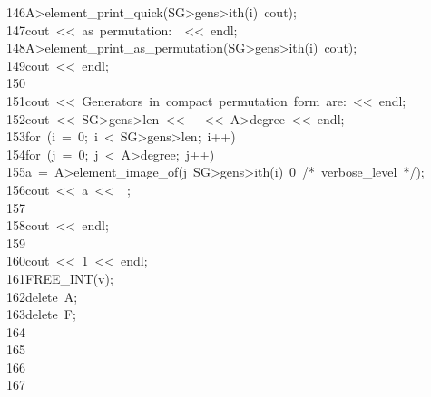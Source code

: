 \begin{tabbing}
146\>\>\>A>element\_print\_quick(SG>gens>ith(i)\ cout);\\[0pt]
147\>\>\>cout\ <<\ as\ permutation:\ \ <<\ endl;\\[0pt]
148\>\>\>A>element\_print\_as\_permutation(SG>gens>ith(i)\ cout);\\[0pt]
149\>\>\>cout\ <<\ endl;\\[0pt]
150\>\>\>\\[0pt]
151\>\>cout\ <<\ Generators\ in\ compact\ permutation\ form\ are:\ <<\ endl;\\[0pt]
152\>\>cout\ <<\ SG>gens>len\ <<\ \ \ <<\ A>degree\ <<\ endl;\\[0pt]
153\>\>for\ (i\ =\ 0;\ i\ <\ SG>gens>len;\ i++)\ \\[0pt]
154\>\>\>for\ (j\ =\ 0;\ j\ <\ A>degree;\ j++)\ \\[0pt]
155\>\>\>\>a\ =\ A>element\_image\_of(j\ SG>gens>ith(i)\ 0\ /*\ verbose\_level\ */);\\[0pt]
156\>\>\>\>cout\ <<\ a\ <<\ \ ;\\[0pt]
157\>\>\>\>\\[0pt]
158\>\>\>cout\ <<\ endl;\\[0pt]
159\>\>\>\\[0pt]
160\>\>cout\ <<\ 1\ <<\ endl;\\[0pt]
161\>\>FREE\_INT(v);\\[0pt]
162\>\>delete\ A;\\[0pt]
163\>\>delete\ F;\\[0pt]
164\>\\[0pt]
165\>\\[0pt]
166\>\\[0pt]
167\>\end{tabbing}
